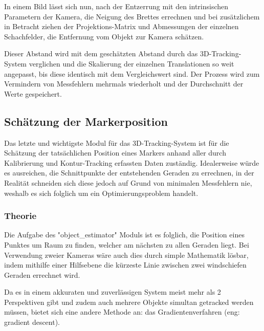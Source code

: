 \documentclass[12pt, ngerman]{article}
\begin{document}
In einem Bild lässt sich nun, nach der Entzerrung mit den intrinsischen
Parametern der Kamera, die Neigung des Brettes errechnen und bei zusätzlichem in
Betracht ziehen der Projektions-Matrix und Abmessungen der einzelnen
Schachfelder, die Entfernung vom Objekt zur Kamera schätzen.

Dieser Abstand wird mit dem geschätzten Abstand durch das 3D-Tracking-System
verglichen und die Skalierung der einzelnen Translationen so weit angepasst, bis
diese identisch mit dem Vergleichswert sind. Der Prozess wird zum Vermindern von
Messfehlern mehrmals wiederholt und der Durchschnitt der Werte gespeichert.

\subsection{Schätzung der Markerposition}
Das letzte und wichtigste Modul für das 3D-Tracking-System ist für die Schätzung der tatsächlichen Position eines Markers anhand aller durch Kalibrierung und Kontur-Tracking erfassten Daten zuständig. Idealerweise würde es ausreichen, die Schnittpunkte der entstehenden Geraden zu errechnen, in der Realität schneiden sich diese jedoch auf Grund von minimalen Messfehlern nie, weshalb es sich folglich um ein Optimierungsproblem handelt. 

\subsubsection{Theorie}
Die Aufgabe des "object\_estimator" Moduls ist es folglich, die Position eines Punktes um Raum zu finden, welcher am nächsten zu allen Geraden liegt. Bei Verwendung zweier Kameras wäre auch dies durch simple Mathematik lösbar, indem mithilfe einer Hilfsebene die kürzeste Linie zwischen zwei windschiefen Geraden errechnet wird.

Da es in einem akkuraten und zuverlässigen System meist mehr als 2 Perspektiven gibt und zudem auch mehrere Objekte simultan getracked werden müssen, bietet sich eine andere Methode an: das Gradientenverfahren (eng: gradient descent). 
\end{document}
